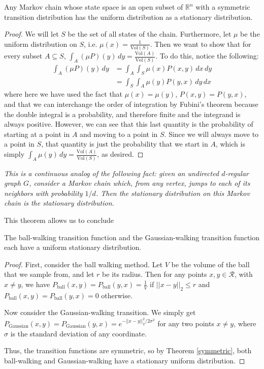 \documentclass[11pt]{article}
\begin{document}
\begin{theorem}
Any Markov chain whose state space is an open subset of $\mathbb{R}^n$ with a symmetric transition distribution has the uniform distribution as a stationary distribution.
\label{symmetric}
\end{theorem}
\begin{proof}
We will let $S$ be the set of all states of the chain. Furthermore, let $\mu$ be the uniform distribution on $S$, i.e. $\mu(x) = \frac{1}{\text{Vol}(S)}$. Then we want to show that for every subset $A \subseteq S$, $\int_A (\mu P)(y)\, dy = \frac{\text{Vol}(A)}{\text{Vol}(S)}$. To do this, notice the following:
\begin{align*}
\int_A (\mu P)(y)\, dy &= \int_A \int_S \mu(x)P(x,y)\, dx\, dy \\
&= \int_S \int_A \mu(y)P(y,x)\, dy\, dx
\end{align*}
where here we have used the fact that $\mu(x) = \mu(y)$, $P(x,y) = P(y,x)$, and that we can interchange the order of integration by Fubini's theorem because the double integral is a probability, and therefore finite and the integrand is always positive. However, we can see that this last quantity is the probability of starting at a point in $A$ and moving to a point in $S$. Since we will always move to a point in $S$, that quantity is just the probability that we start in $A$, which is simply $\int_A \mu(y)\, dy = \frac{\text{Vol}(A)}{\text{Vol}(S)}$, as desired.
\end{proof}
\begin{remark} 
\emph{This is a continuous analog of the following fact: given an undirected $d$-regular graph $G$, consider a Markov chain which, from any vertex, jumps to each of its neighbors with probability $1/d$. Then the stationary distribution on this Markov chain is the stationary distribution.}
\end{remark}

This theorem allows us to conclude
\begin{proposition}
The ball-walking transition function and the Gaussian-walking transition function each have a uniform stationary distribution.
\end{proposition}
\begin{proof}
First, consider the ball walking method. Let $V$ be the volume of the ball that we sample from, and let $r$ be its radius. Then for any points $x,y\in\mathcal{R}$, with $x\ne y$, we have $P_\text{ball}(x,y) = P_\text{ball}(y,x) = \frac{1}{V}$ if $||x-y||_2 \le r$ and $P_\text{ball}(x,y) = P_\text{ball}(y,x) = 0$ otherwise.

Now consider the Gaussian-walking transition. We simply get $P_\text{Gaussian}(x,y) = P_\text{Gaussian}(y,x) = e^{-||x-y||_2^2 / 2\sigma^2}$ for any two points $x\ne y$, where $\sigma$ is the standard deviation of any coordinate.

Thus, the transition functions are symmetric, so by Theorem \ref{symmetric}, both ball-walking and Gaussian-walking have a stationary uniform distribution.
\end{proof}
\end{document}
